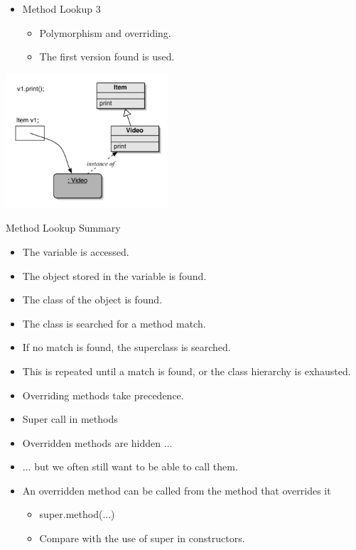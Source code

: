 \documentclass{beamer}
\begin{document}
\begin{frame}
\begin{itemize}
\item Method Lookup 3
\begin{itemize}
\item Polymorphism and overriding.
\item The first version found is used.
\end{itemize}
\end{itemize}
\begin{center}
\includegraphics[height=5cm, keepaspectratio]{images/poly5}
\end{center}
\end{frame}\begin{frame}


Method Lookup Summary
\begin{itemize}
\item The variable is accessed.
\item The object stored in the variable is found.
\item The class of the object is found.
\item The class is searched for a method match.
\item If no match is found, the superclass is searched.
\item This is repeated until a match is found, or the class hierarchy is exhausted.
\item Overriding methods take precedence.
\end{itemize}
\end{frame}

\begin{frame}
\begin{itemize}
\item Super call in methods
\item Overridden methods are hidden ...
\item ... but we often still want to be able to call them.
\item An overridden method can be called from the method that overrides it
\begin{itemize}
\item super.method(...)
\item Compare with the use of super in constructors.
\end{itemize}
\end{itemize}
\end{frame}
\end{document}
